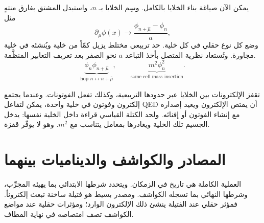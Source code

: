 يمكن الآن صياغة بناء الخلايا بالكامل. وسِم الخلايا بـ \(n\)، واستبدل المشتق بفارق منتهٍ مثل
\begin{equation}
\partial_\mu\phi(x)
\longrightarrow
\frac{\phi_{n+\hat\mu}-\phi_n}{a},
\end{equation}
وضع كل نوع حقلي في كل خلية. حد تربيعي مختلط يزيل كمّاً من خلية ويُنشئه في خلية مجاورة. وتُستعاد نظرية المتصل بأخذ التباعد \(a\) نحو الصفر بعد تعريف التعابير المنظَّمة.
\begin{equation}
\underbrace{\phi_n\phi_{n+\hat\mu}}_{\text{hop }n\leftrightarrow n+\hat\mu},
\qquad
\underbrace{m^2\phi_n^2}_{\text{same-cell mass insertion}}.
\end{equation}

\begin{classroomqa}
\end{classroomqa}

تقفز الإلكترونات بين الخلايا عبر حدودها التربيعية، وكذلك تفعل الفوتونات. وعندما يجتمع إلكترون وفوتون في خلية واحدة، يمكن لتفاعل QED أن يمتص الإلكترون ويعيد إصداره مع إنشاء الفوتون أو إفنائه. ولحد الكتلة القياسي قراءة داخل الخلية نفسها: يدخل الجسيم تلك الخلية ويغادرها بمعامل يتناسب مع \(m^2\). وهو لا يوفّر قفزة.

\begin{classroomqa}
\end{classroomqa}

\begin{classroomqa}
\end{classroomqa}

\section{المصادر والكواشف والديناميات بينهما}

العملية الكاملة هي تاريخ في الزمكان. ويتحدد شرطها الابتدائي بما يهيئه المجرِّب، وشرطها النهائي بما تسجله الكواشف. ومصدر بسيط هو فتيلة ساخنة تبعث إلكتروناً. فمؤثر حقلي عند الفتيلة ينشئ ذلك الإلكترون الوارد؛ ومؤثرات حقلية عند مواضع الكواشف تصف امتصاصه في نهاية المطاف.

